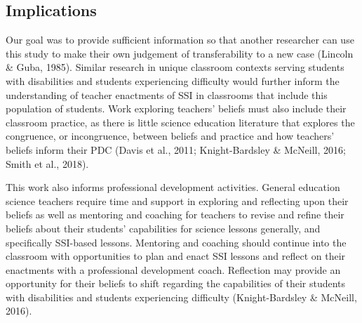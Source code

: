 \documentclass[11.5pt]{sig-alternate}
\begin{document}
\begin{large}
\section*{Implications}

Our goal was to provide sufficient information so that another researcher can use this study to make their own judgement of transferability to a new case (Lincoln \& Guba, 1985). Similar research in unique classroom contexts serving students with disabilities and students experiencing difficulty would further inform the understanding of teacher enactments of SSI in classrooms that include this population of students. Work exploring teachers’ beliefs must also include their classroom practice, as there is little science education literature that explores the congruence, or incongruence, between beliefs and practice and how teachers’ beliefs inform their PDC (Davis et al., 2011; Knight-Bardsley \& McNeill, 2016; Smith et al., 2018).

This work also informs professional development activities. General education science teachers require time and support in exploring and reflecting upon their beliefs as well as mentoring and coaching for teachers to revise and refine their beliefs about their students’ capabilities for science lessons generally, and specifically SSI-based lessons. Mentoring and coaching should continue into the classroom with opportunities to plan and enact SSI lessons and reflect on their enactments with a professional development coach. Reflection may provide an opportunity for their beliefs to shift regarding the capabilities of their students with disabilities and students experiencing difficulty (Knight-Bardsley \& McNeill, 2016).


\end{large}
\end{document}
